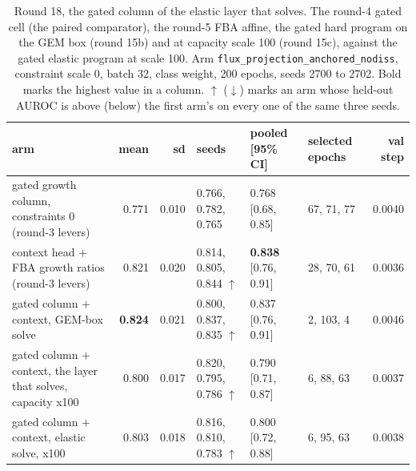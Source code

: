 \begin{table}[H]
  \centering
  \scriptsize
  \setlength{\tabcolsep}{3pt}
  \caption[Round 18, the gated column of the elastic layer that solves]{Round 18, the gated column of the elastic layer that solves. The round-4 gated cell (the paired comparator), the round-5 FBA affine, the gated hard program on the GEM box (round 15b) and at capacity scale 100 (round 15c), against the gated elastic program at scale 100. Arm \texttt{flux\_projection\_anchored\_nodiss}, constraint scale 0, batch 32, class weight, 200 epochs, seeds 2700 to 2702. Bold marks the highest value in a column. $\uparrow$ ($\downarrow$) marks an arm whose held-out AUROC is above (below) the first arm's on every one of the same three seeds.}
  \label{tab:w33}
  \begin{tabular}{@{}lrrlllr@{}}
    \hline
    arm & mean & sd & seeds & pooled [95\% CI] & selected epochs & val step \\
    \hline
    gated growth column, constraints 0 (round-3 levers) & 0.771 & 0.010 & 0.766, 0.782, 0.765 & 0.768 [0.68, 0.85] & 67, 71, 77 & 0.0040 \\
    context head $+$ FBA growth ratios (round-3 levers) & 0.821 & 0.020 & 0.814, 0.805, 0.844 $\uparrow$ & \textbf{0.838} [0.76, 0.91] & 28, 70, 61 & 0.0036 \\
    gated column $+$ context, GEM-box solve & \textbf{0.824} & 0.021 & 0.800, 0.837, 0.835 $\uparrow$ & 0.837 [0.76, 0.91] & 2, 103, 4 & 0.0046 \\
    gated column $+$ context, the layer that solves, capacity x100 & 0.800 & 0.017 & 0.820, 0.795, 0.786 $\uparrow$ & 0.790 [0.71, 0.87] & 6, 88, 63 & 0.0037 \\
    gated column $+$ context, elastic solve, x100 & 0.803 & 0.018 & 0.816, 0.810, 0.783 $\uparrow$ & 0.800 [0.72, 0.88] & 6, 95, 63 & 0.0038 \\
    \hline
  \end{tabular}
\end{table}
